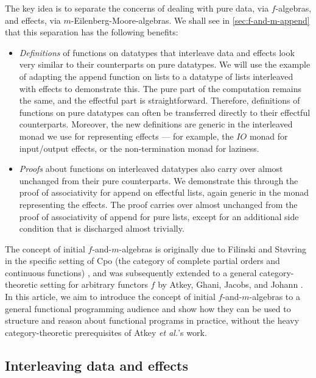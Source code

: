 \documentclass{jfp1}
\begin{document}
The key idea is to separate the concerns of dealing with pure data,
via $f$-algebras, and effects, via $m$-Eilenberg-Moore-algebras. We
shall see in \autoref{sec:f-and-m-append} that this separation has the
following benefits:
\begin{itemize}
\item \emph{Definitions} of functions on datatypes that interleave
  data and effects look very similar to their counterparts on pure
  datatypes. We will use the example of adapting the append function
  on lists to a datatype of lists interleaved with effects to
  demonstrate this. The pure part of the computation remains the same,
  and the effectful part is straightforward. Therefore, definitions of
  functions on pure datatypes can often be transferred directly to
  their effectful counterparts. Moreover, the new definitions are
  generic in the interleaved monad we use for representing effects ---
  for example, the $\mathit{IO}$ monad for input/output effects, or
  the non-termination monad for laziness.
\item \emph{Proofs} about functions on interleaved datatypes also
  carry over almost unchanged from their pure counterparts. We
  demonstrate this through the proof of associativity for append on
  effectful lists, again generic in the monad representing the
  effects. The proof carries over almost unchanged from the proof of
  associativity of append for pure lists, except for an additional
  side condition that is discharged almost trivially.
\end{itemize}


The concept of initial $f$-and-$m$-algebras is originally due to
Filinski and St\o{}vring in the specific setting of Cpo (the category
of complete partial orders and continuous functions)
\cite{filinski07inductive}, and was subsequently extended to a general
category-theoretic setting for arbitrary functors $f$ by Atkey, Ghani,
Jacobs, and Johann \cite{atkey12fibrational}.  In this article, we aim
to introduce the concept of initial $f$-and-$m$-algebras to a general
functional programming audience and show how they can be used to
structure and reason about functional programs in practice, without
the heavy category-theoretic prerequisites of Atkey \emph{et al.}'s
work.

\subsection{Interleaving data and effects}
\label{sec:motivate-interleaving}
\end{document}
